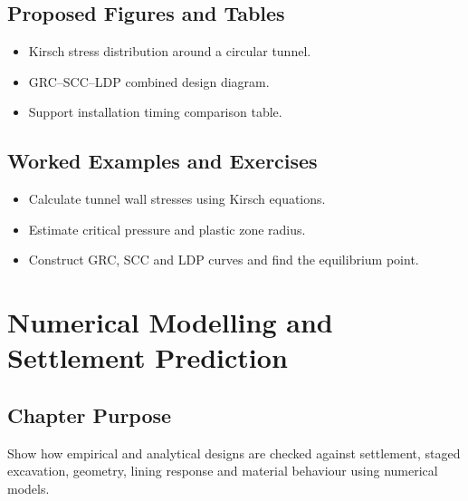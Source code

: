 \documentclass[12pt,oneside]{book}
\begin{document}
\section{Proposed Figures and Tables}
\begin{itemize}
    \item Kirsch stress distribution around a circular tunnel.
    \item GRC--SCC--LDP combined design diagram.
    \item Support installation timing comparison table.
\end{itemize}

\section{Worked Examples and Exercises}
\begin{itemize}
    \item Calculate tunnel wall stresses using Kirsch equations.
    \item Estimate critical pressure and plastic zone radius.
    \item Construct GRC, SCC and LDP curves and find the equilibrium point.
\end{itemize}

\chapter{Numerical Modelling and Settlement Prediction}

\section{Chapter Purpose}
Show how empirical and analytical designs are checked against settlement, staged excavation, geometry, lining response and material behaviour using numerical models.
\end{document}
